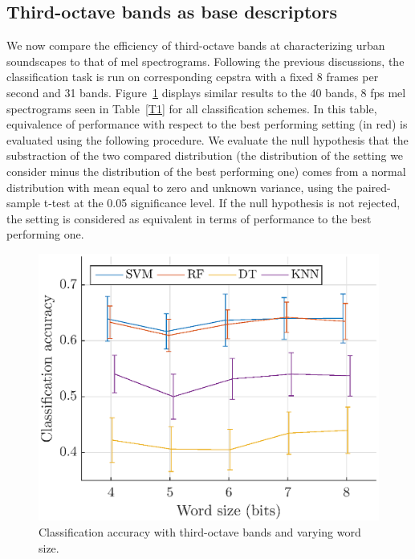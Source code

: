 \documentclass[final,3p,times,twocolumn]{elsarticle}
\begin{document}
\subsection{Third-octave bands as base descriptors}

We now compare the efficiency of third-octave bands at characterizing urban soundscapes to that of mel spectrograms. Following the previous discussions, the classification task is run on corresponding cepstra with a fixed 8 frames per second and 31 bands. Figure~\ref{fig:class_tob_q} displays similar results to the 40 bands, 8 fps mel spectrograms seen in Table~\ref{T1} for all classification schemes. In this table, equivalence of performance with respect to the best performing setting (in red) is evaluated using the following procedure. We evaluate the null hypothesis that the substraction of the two compared distribution (the distribution of the setting we consider minus the distribution of the best performing one) comes from a normal distribution with mean equal to zero and unknown variance, using the paired-sample t-test at the 0.05 significance level. If the null hypothesis is not rejected, the setting is considered as equivalent in terms of performance to the best performing one. \\

\begin{figure}[htbp]
	\centering
		\includegraphics[width=\columnwidth]{figures/class_tob_q.eps}
	\caption{Classification accuracy with third-octave bands and varying word size.}
	\label{fig:class_tob_q}
\end{figure}
\end{document}
